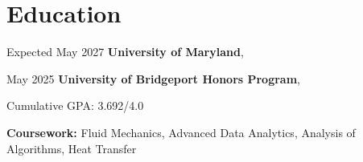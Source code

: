 \section{Education}
    \begin{twocolentry}{
        Expected May 2027
    }
        \textbf{University of Maryland},
    \end{twocolentry}

    \vspace{0.30 cm}
    
    \begin{twocolentry}{
        May 2025
    }
        \textbf{University of Bridgeport Honors Program}, 
    \end{twocolentry}

    \vspace{0.10 cm}
    
    \begin{onecolentry}
        \begin{highlights}
            \item Cumulative GPA: 3.692/4.0
            \item \textbf{Coursework:} Fluid Mechanics, Advanced Data Analytics, Analysis of Algorithms, Heat Transfer
        \end{highlights}
    \end{onecolentry}